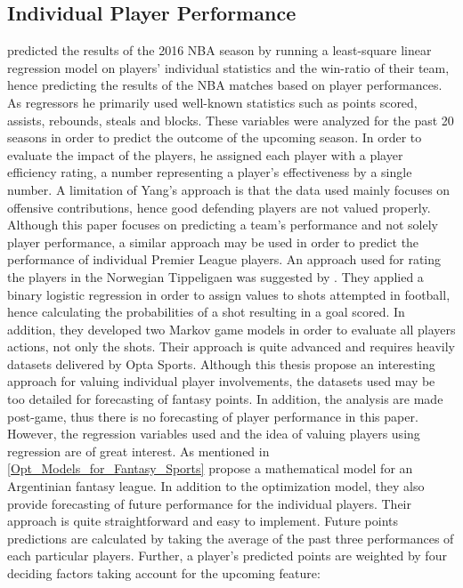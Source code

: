 \subsection{Individual Player Performance} \label{Forecasting_of_player_performance}
\cite{Yang} predicted the results of the 2016 NBA season by running a least-square linear regression model on players’ individual statistics and the win-ratio of their team, hence predicting the results of the NBA matches based on player performances. As regressors he primarily used well-known statistics such as points scored, assists, rebounds, steals and blocks. These variables were analyzed for the past 20 seasons in order to predict the outcome of the upcoming season. In order to evaluate the impact of the players, he assigned each player with a player efficiency rating, a number representing a player’s effectiveness by a single number. A limitation of Yang’s approach is that the data used mainly focuses on offensive contributions, hence good defending players are not valued properly. Although this paper focuses on predicting a team’s performance and not solely player performance, a similar approach may be used in order to predict the performance of individual Premier League players. 
\newpar
An approach used for rating the players in the Norwegian Tippeligaen was suggested by \citep{vabo}. They applied a binary logistic regression in order to assign values to shots attempted in football, hence calculating the probabilities of a shot resulting in a goal scored. In addition, they developed two Markov game models in order to evaluate all players actions, not only the shots. Their approach is quite advanced and requires heavily datasets delivered by Opta Sports. Although this thesis propose an interesting approach for valuing individual player involvements, the datasets used may be too detailed for forecasting of fantasy points. In addition, the analysis are made post-game, thus there is no forecasting of player performance in this paper. However, the regression variables used and the idea of valuing players using regression are of great interest.
\newpar
As mentioned in \ref{Opt_Models_for_Fantasy_Sports} \cite{Bonomo} propose a mathematical model for an Argentinian fantasy league. In addition to the optimization model, they also provide forecasting of future performance for the individual players. Their approach is quite straightforward and easy to implement. Future points predictions are calculated by taking the average of the past three performances of each particular players. Further, a player's predicted points are weighted by four deciding factors taking account for the upcoming feature:
